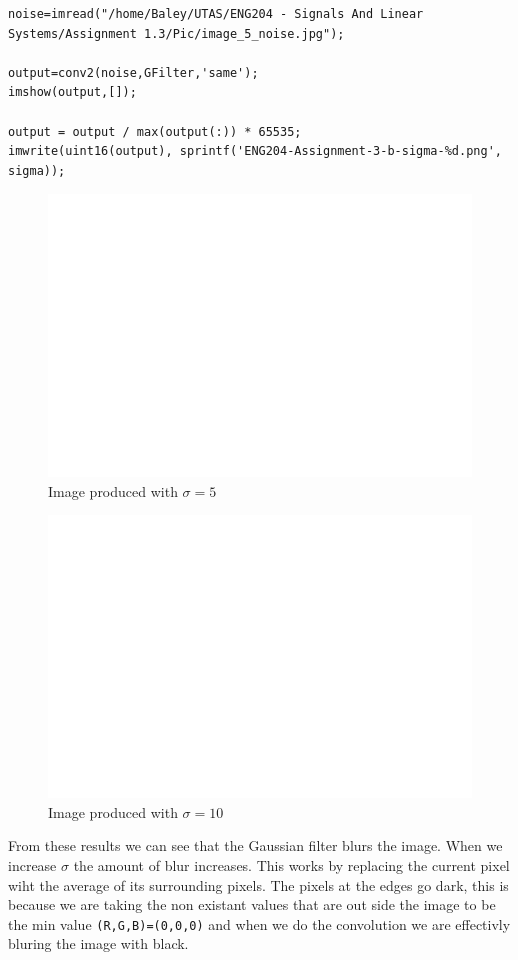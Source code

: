 \documentclass[11pt]{article}
\begin{document}
\begin{verbatim}
noise=imread("/home/Baley/UTAS/ENG204 - Signals And Linear Systems/Assignment 1.3/Pic/image_5_noise.jpg");

output=conv2(noise,GFilter,'same');
imshow(output,[]);

output = output / max(output(:)) * 65535;
imwrite(uint16(output), sprintf('ENG204-Assignment-3-b-sigma-%d.png', sigma));
\end{verbatim}

\begin{FIGURE}
\begin{figure}[H]
\centering
\includegraphics[width=.9\linewidth]{ENG204-Assignment-3-b-sigma-5.png}
\caption{Image produced with \(\sigma=5\)}
\end{figure}
\end{FIGURE}

\begin{FIGURE}
\begin{figure}[H]
\centering
\includegraphics[width=.9\linewidth]{ENG204-Assignment-3-b-sigma-10.png}
\caption{Image produced with \(\sigma=10\)}
\end{figure}
\end{FIGURE}
From these results we can see that the Gaussian filter blurs the image. When we increase \(\sigma\) the amount of blur increases. This works by replacing the current pixel wiht the average of its surrounding pixels. The pixels at the edges go dark, this is because we are taking the non existant values that are out side the image to be the min value \texttt{(R,G,B)=(0,0,0)} and when we do the convolution we are effectivly bluring the image with black.
\end{document}
